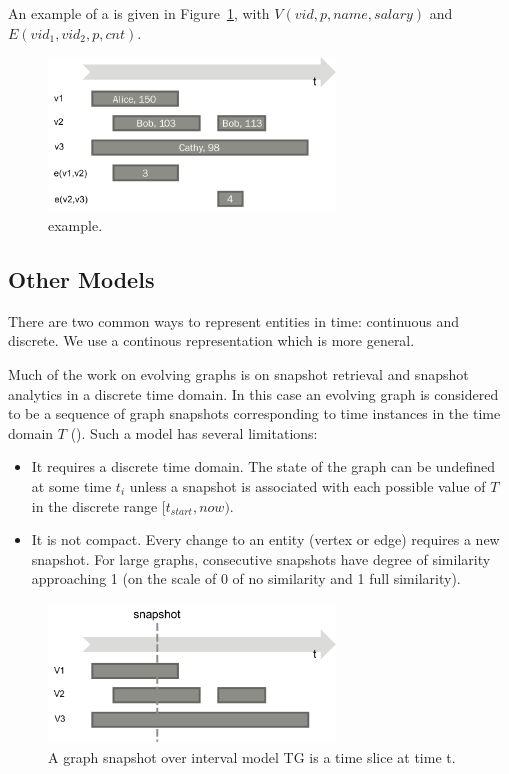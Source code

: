 An example of a \tg is given in Figure~\ref{fig:tg}, with 
$V(vid,p,name,salary)$ and $E(vid_1, vid_2, p, cnt)$.

\begin{figure}
\includegraphics[width=3in]{figs/T1.pdf}
\caption{\tg {} example.}
\label{fig:tg}
\end{figure}


\subsection{Other Models}
\label{sec:model:others}

There are two common ways to represent entities in time: continuous
and discrete.  We use a continous representation which is more general.

Much of the work on evolving graphs is on snapshot retrieval and
snapshot analytics in a discrete time domain.  In this case an
evolving graph is considered to be a sequence of graph snapshots
corresponding to time instances in the time domain $T$
(\cite{Khurana2013,DBLP:journals/tos/MiaoHLWYZPCC15,Ren2011}).  Such a
model has several limitations:

\begin{itemize}[noitemsep,topsep=0pt]
\item It requires a discrete time domain.  The state of the graph can
  be undefined at some time $t_i$ unless a snapshot is associated with
  each possible value of $T$ in the discrete range $[t_{start}, now)$.
\item It is not compact.  Every change to an entity (vertex or edge)
  requires a new snapshot.  For large graphs, consecutive snapshots
  have degree of similarity approaching 1 (on the scale of 0 of no
  similarity and 1 full similarity).
\end{itemize}

\begin{figure}[h]
\includegraphics[width=3in]{figs/getsnap.pdf}
\caption{A graph snapshot over interval model TG is a time slice at time t.}
\label{fig:getsnap}
\end{figure}


